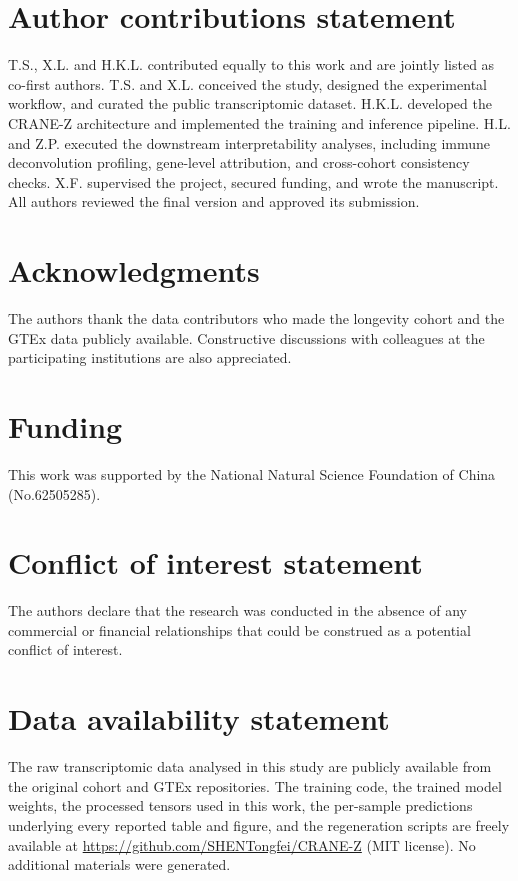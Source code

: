 \documentclass[unnumsec,webpdf,contemporary,large]{oup-authoring-template}
\begin{document}
\section{Author contributions statement}\label{sec:contrib}
T.S., X.L. and H.K.L. contributed equally to this work and are jointly listed as co-first authors. T.S. and X.L. conceived the study, designed the experimental workflow, and curated the public transcriptomic dataset. H.K.L. developed the CRANE-Z architecture and implemented the training and inference pipeline. H.L. and Z.P. executed the downstream interpretability analyses, including immune deconvolution profiling, gene-level attribution, and cross-cohort consistency checks. X.F. supervised the project, secured funding, and wrote the manuscript. All authors reviewed the final version and approved its submission.

\section{Acknowledgments}\label{sec:ack}
The authors thank the data contributors who made the longevity cohort and the GTEx data publicly available. Constructive discussions with colleagues at the participating institutions are also appreciated.

\section{Funding}\label{sec:fund}
This work was supported by the National Natural Science Foundation of China (No.62505285).

\section{Conflict of interest statement}\label{sec:coi}
The authors declare that the research was conducted in the absence of any commercial or financial relationships that could be construed as a potential conflict of interest.

\section{Data availability statement}\label{sec:dataavail}
The raw transcriptomic data analysed in this study are publicly available from the original cohort and GTEx repositories. The training code, the trained model weights, the processed tensors used in this work, the per-sample predictions underlying every reported table and figure, and the regeneration scripts are freely available at \href{https://github.com/SHENTongfei/CRANE-Z}{https://github.com/SHENTongfei/CRANE-Z} (MIT license). No additional materials were generated.
\end{document}
